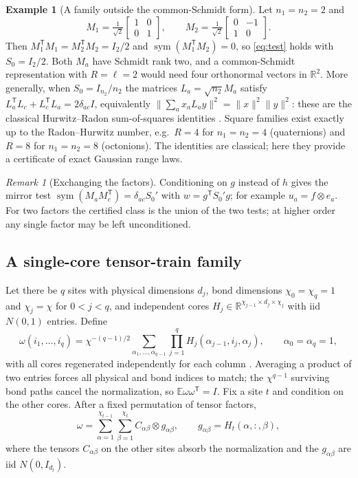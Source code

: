 \documentclass[11pt,a4paper]{article}
\theoremstyle{definition}
\newtheorem{example}[theorem]{Example}
\theoremstyle{remark}
\newtheorem{remark}[theorem]{Remark}
\numberwithin{equation}{section}
\newcommand{\E}{\mathbb E}
\newcommand{\R}{\mathbb R}
\newcommand{\T}{{\mathsf T}}
\newcommand{\sym}{\operatorname{sym}}
\newcommand{\norm}[1]{\lVert#1\rVert}
\begin{document}
\begin{example}[A family outside the common-Schmidt form]\label{ex:hurwitz}
Let $n_1=n_2=2$ and
\[
 M_1=\tfrac1{\sqrt2}\begin{bmatrix}1&0\\0&1\end{bmatrix},\qquad
 M_2=\tfrac1{\sqrt2}\begin{bmatrix}0&-1\\1&0\end{bmatrix}.
\]
Then $M_1^\T M_1=M_2^\T M_2=I_2/2$ and $\sym(M_1^\T M_2)=0$, so
\eqref{eq:test} holds with $S_0=I_2/2$. Both $M_a$ have Schmidt rank two, and a
common-Schmidt representation with $R=\ell=2$ would need four orthonormal
vectors in $\R^2$. More generally, when $S_0=I_{n_2}/n_2$ the matrices
$L_a=\sqrt{n_2}M_a$ satisfy $L_a^\T L_c+L_c^\T L_a=2\delta_{ac}I$, equivalently
$\norm{\sum_ax_aL_ay}^2=\norm x^2\norm y^2$: these are the classical
Hurwitz--Radon sum-of-squares identities \cite{LMO}. Square families exist
exactly up to the Radon--Hurwitz number, e.g.\ $R=4$ for $n_1=n_2=4$
(quaternions) and $R=8$ for $n_1=n_2=8$ (octonions). The identities are
classical; here they provide a certificate of exact Gaussian range laws.
\end{example}

\begin{remark}[Exchanging the factors]\label{rem:mirror}
Conditioning on $g$ instead of $h$ gives the mirror test
$\sym(M_aM_c^\T)=\delta_{ac}S_0'$ with $w=g^\T S_0'g$; for example
$u_a=f\otimes e_a$. For two factors the certified class is the union of the two
tests; at higher order any single factor may be left unconditioned.
\end{remark}

\subsection{A single-core tensor-train family}

Let there be $q$ sites with physical dimensions $d_j$, bond dimensions
$\chi_0=\chi_q=1$ and $\chi_j=\chi$ for $0<j<q$, and independent cores
$H_j\in\R^{\chi_{j-1}\times d_j\times\chi_j}$ with iid $N(0,1)$ entries. Define
\begin{equation}\label{eq:tt}
 \omega(i_1,\ldots,i_q)=\chi^{-(q-1)/2}\sum_{\alpha_1,\ldots,\alpha_{q-1}}
 \prod_{j=1}^qH_j(\alpha_{j-1},i_j,\alpha_j),\qquad\alpha_0=\alpha_q=1,
\end{equation}
with all cores regenerated independently for each column \cite{RR,CDF}.
Averaging a product of two entries forces all physical and bond indices to
match; the $\chi^{q-1}$ surviving bond paths cancel the normalization, so
$\E\omega\omega^\T=I$. Fix a site $t$ and condition on the other cores.
After a fixed permutation of tensor factors,
\begin{equation}\label{eq:tt-cut}
 \omega=\sum_{\alpha=1}^{\chi_{t-1}}\sum_{\beta=1}^{\chi_t}
 C_{\alpha\beta}\otimes g_{\alpha\beta},\qquad g_{\alpha\beta}=H_t(\alpha,:,\beta),
\end{equation}
where the tensors $C_{\alpha\beta}$ on the other sites absorb the normalization
and the $g_{\alpha\beta}$ are iid $N(0,I_{d_t})$.
\end{document}
